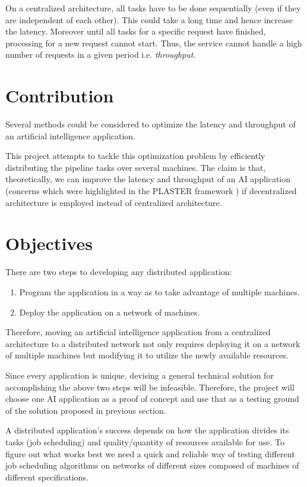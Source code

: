 \documentclass{report}
\begin{document}
On a centralized architecture, all tasks have to be done sequentially (even if they are independent of each other). This could take a long time and hence increase the latency. Moreover until all tasks for a specific request have finished, processing for a new request cannot start. Thus, the service cannot handle a high number of requests in a given period i.e. \textit{throughput}.

\section{Contribution}

Several methods could be considered to optimize the latency and throughput of an artificial intelligence application.

This project attempts to tackle this optimization problem by efficiently distributing the pipeline tasks over several machines. The claim is that, theoretically, we can improve the latency and throughput of an AI application (concerns which were highlighted in the PLASTER framework \cite{Teich2018}) if decentralized architecture is employed instead of centralized architecture.

\section{Objectives}\label{objectives}

There are two steps to developing any distributed application:
\begin{enumerate}
  \item Program the application in a way as to take advantage of multiple machines.
  \item Deploy the application on a network of machines.
\end{enumerate}

Therefore, moving an artificial intelligence application from a centralized architecture to a distributed network not only requires deploying it on a network of multiple machines but modifying it to utilize the newly available resources.

Since every application is unique, devising a general technical solution for accomplishing the above two steps will be infeasible. Therefore, the project will choose one AI application as a proof of concept and use that as a testing ground of the solution proposed in previous section.

A distributed application's success depends on how the application divides its tasks (job scheduling) and quality/quantity of resources available for use. To figure out what works best we need a quick and reliable way of testing different job scheduling algorithms on networks of different sizes composed of machines of different specifications.
\end{document}
